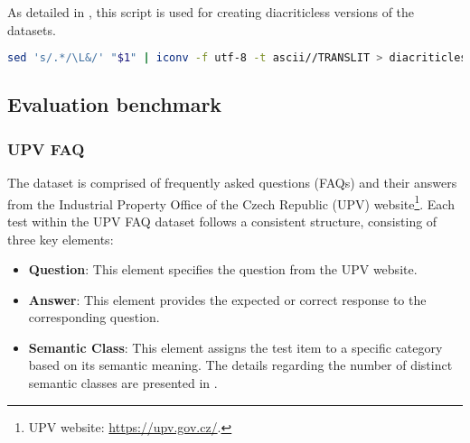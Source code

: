 As detailed in , this script is used for creating diacriticless versions of the datasets.

\begin{lstlisting}[language=bash,basicstyle=\small\ttfamily, frame=single, caption={Script for removing diacritics using Unix utilities.}, captionpos=b, label={lst:diacriticless.sh},backgroundcolor=\color{light-gray}] 
 sed 's/.*/\L&/' "$1" | iconv -f utf-8 -t ascii//TRANSLIT > diacriticless/"$1"
\end{lstlisting}

\subsection{Evaluation benchmark}

\subsubsection{UPV FAQ}

The dataset is comprised of frequently asked questions (FAQs) and their answers from the Industrial Property Office of the Czech Republic (UPV) website\footnote{\label{footnote_upv_website}UPV website: \url{https://upv.gov.cz/}.}.
Each test within the UPV FAQ dataset follows a consistent structure, consisting of three key elements:
\begin{itemize}
  \item \textbf{Question}:
 This element specifies the question from the UPV website.
  \item \textbf{Answer}:
 This element provides the expected or correct response to the corresponding question.
  \item \textbf{Semantic Class}:
 This element assigns the test item to a specific category based on its semantic meaning.
 The details regarding the number of distinct semantic classes are presented in .
\end{itemize}



